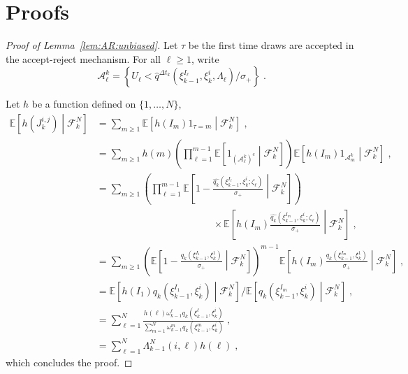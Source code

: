 \documentclass[12pt,draft]{article}
\newcommand{\eqsp}{\;}
\newcommand{\1}{\mathrm{1}}
\begin{document}
\appendix

\section{Proofs}
\label{sec:append:proofs}
\begin{proof}[Proof of Lemma~\ref{lem:AR:unbiased}]
Let $\tau$ be the first time  draws are accepted in the accept-reject mechanism. For all $\ell\ge 1$, write
\[
\mathcal{A}^k_{\ell} = \left\{U_\ell<\widehat{q}^{\Delta t_k}(\xi_{k-1}^{I_\ell},\xi_k^{i},\Lambda_{\ell})/\sigma_+\right\}\eqsp.
\]

Let $h$ be a function defined on $\{1,\ldots,N\}$,
\begin{align*}
\mathbb{E}\left[h(J^{i,j}_k)\middle| \mathcal{F}_k^N\right] & = \sum_{m\ge 1}\mathbb{E}\left[h(I_m)\1_{\tau=m}\middle| \mathcal{F}_k^N\right]\eqsp,\\
& = \sum_{m\ge 1}h(m)\left(\prod_{\ell=1}^{m-1}\mathbb{E}\left[\1_{(\mathcal{A}^k_{\ell})^c}\middle| \mathcal{F}_k^N\right]\right)\mathbb{E}\left[h(I_m)\1_{\mathcal{A}^k_{m}}\middle| \mathcal{F}_k^N\right]\eqsp,\\
& = \sum_{m\ge 1}\left(\prod_{\ell=1}^{m-1}\mathbb{E}\left[1-\frac{\widehat{q_k}(\xi_{k-1}^{I_\ell},\xi_k^{i};\zeta_{\ell})}{\sigma_{+}}\middle| \mathcal{F}_k^N\right]\right)\\
&\hspace{5cm}\times\mathbb{E}\left[h(I_m)\frac{\widehat{q_k}(\xi_{k-1}^{I_m},\xi_k^{i};\zeta_{\ell})}{\sigma_{+}}\middle| \mathcal{F}_k^N\right]\eqsp,\\
& = \sum_{m\ge 1}\left(\mathbb{E}\left[1-\frac{q_k(\xi_{k-1}^{I_1},\xi_k^{1})}{\sigma_{+}}\middle| \mathcal{F}_k^N\right]\right)^{m-1}\mathbb{E}\left[h(I_m)\frac{q_k(\xi_{k-1}^{I_m},\xi_k^{1})}{\sigma_{+}}\middle| \mathcal{F}_k^N\right]\eqsp,\\
& = \mathbb{E}\left[h(I_1)q_k(\xi_{k-1}^{I_1},\xi_k^{i})\middle| \mathcal{F}_k^N\right]/\mathbb{E}\left[q_k(\xi_{k-1}^{I_m},\xi_k^{i})\middle| \mathcal{F}_k^N\right]\eqsp,\\
& = \sum_{\ell=1}^N \frac{h(\ell)\omega_{k-1}^{\ell}q_k(\xi_{k-1}^{\ell},\xi_k^{i})}{\sum_{m=1}^N\omega_{k-1}^{m}q_k(\xi_{k-1}^{m},\xi_k^{i})}\eqsp,\\
&= \sum_{\ell=1}^N \Lambda_{k-1}^N(i,\ell)h(\ell) \eqsp,
\end{align*}
which concludes the proof.


\end{proof}
\end{document}
